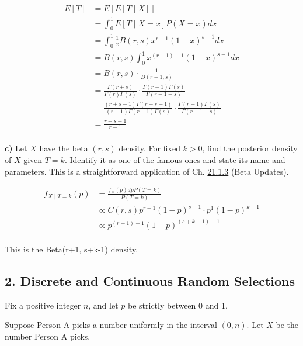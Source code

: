 \documentclass[11pt]{article}
\begin{document}
\begin{align*}
	E[T] &= E[E[T \mid X]] \\
	&= \int_{0}^{1} E[T \mid X = x] P(X = x)dx \\
	&= \int_{0}^{1} \frac{1}{x} B(r,s) x^{r-1}(1-x)^{s-1}dx \\
	&= B(r,s)\int_{0}^{1} x^{(r-1)-1}(1-x)^{s-1}dx \\
	&= B(r,s) \cdot \frac{1}{B(r-1, s)} \\
	&= \frac{\Gamma(r+s)}{\Gamma(r)\Gamma(s)} \cdot \frac{\Gamma(r-1)\Gamma(s)}{\Gamma(r-1+s)} \\
	&= \frac{(r+s-1)\Gamma(r+s-1)}{(r-1)\Gamma(r-1)\Gamma(s)} \cdot \frac{\Gamma(r-1)\Gamma(s)}{\Gamma(r-1+s)} \\
	&= \frac{r+s-1}{r-1} \\
\end{align*}




\textbf{c)} Let \(X\) have the beta \((r, s)\) density. For fixed
\(k > 0\), find the posterior density of \(X\) given \(T = k\). Identify
it as one of the famous ones and state its name and parameters. This is
a straightforward application of Ch.
\href{https://data140.org/textbook/content/chapter-21/updating-and-prediction/\#updating-the-posterior-distribution-of-x-given-s-n}{21.1.3}
(Beta Updates).



\begin{align*}
	f_{X \mid T = k}(p) &= \frac{f_{X}(p)dp P(T=k)}{P(T=k)} \\
	&\propto C(r,s)p^{r-1}(1-p)^{s-1} \cdot p^{1}(1-p)^{k-1} \\
			    &\propto p^{(r+1)-1}(1-p)^{(s+k-1) -1} \\
\end{align*}


This is the Beta(r+1, s+k-1) density. 






    \newpage

    \hypertarget{discrete-and-continuous-random-selections}{%
\subsection{2. Discrete and Continuous Random
Selections}\label{discrete-and-continuous-random-selections}}

Fix a positive integer \(n\), and let \(p\) be strictly between 0 and 1.

Suppose Person A picks a number uniformly in the interval \((0, n)\).
Let \(X\) be the number Person A picks.
\end{document}
